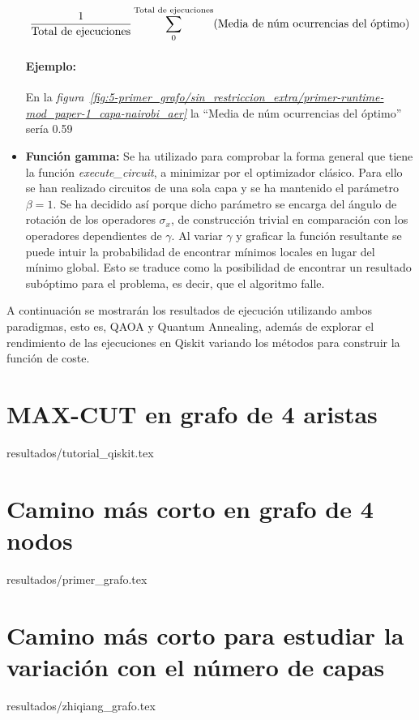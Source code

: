\begin{itemize}
  \begin{align*}
    \frac{1}{\textnormal{Total de ejecuciones}} \sum_0^\textnormal{Total de ejecuciones} (\textnormal{Media de núm ocurrencias del óptimo})
  \end{align*}

  \paragraph{Ejemplo:}

  En la \textit{figura~\ref{fig:5-primer_grafo/sin_restriccion_extra/primer-runtime-mod_paper-1_capa-nairobi_aer}} la ``Media de núm ocurrencias del óptimo'' sería 0.59
  
\item \textbf{Función gamma:}
  Se ha utilizado para comprobar la forma general que tiene la función \textit{execute\_circuit}, a minimizar por el optimizador clásico. Para ello se han realizado circuitos de una sola capa y se ha mantenido el parámetro \(\beta=1\). Se ha decidido así porque dicho parámetro se encarga del ángulo de rotación de los operadores \(\sigma_{x}\), de construcción trivial en comparación con los operadores dependientes de \(\gamma\).
  Al variar \(\gamma\) y graficar la función resultante se puede intuir la probabilidad de encontrar mínimos locales en lugar del mínimo global. Esto se traduce como la posibilidad de encontrar un resultado subóptimo para el problema, es decir, que el algoritmo falle.
\end{itemize}

A continuación se mostrarán los resultados de ejecución utilizando ambos paradigmas, esto es, QAOA y Quantum Annealing, además de explorar el rendimiento de las ejecuciones en Qiskit variando los métodos para construir la función de coste.

\newpage

\section{MAX-CUT en grafo de 4 aristas}{resultados/tutorial_qiskit.tex}

\newpage

\section{Camino más corto en grafo de 4 nodos\label{sec:5-primer_grafo}}{resultados/primer_grafo.tex}

\newpage

\section{Camino más corto para estudiar la variación con el número de capas}{resultados/zhiqiang_grafo.tex}

